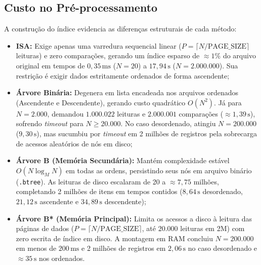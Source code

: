 \documentclass[12pt,a4paper]{article}
\begin{document}
\subsection{Custo no Pré-processamento}
A construção do índice evidencia as diferenças estruturais de cada método:
\begin{itemize}
    \item \textbf{ISA:} Exige apenas uma varredura sequencial linear ($P = \lceil N / \text{PAGE\_SIZE} \rceil$ leituras) e zero comparações, gerando um índice esparso de $\approx 1\%$ do arquivo original em tempos de $0{,}35\,\text{ms}$ ($N=20$) a $17{,}94\,\text{s}$ ($N=2.000.000$). Sua restrição é exigir dados estritamente ordenados de forma ascendente;
    \item \textbf{Árvore Binária:} Degenera em lista encadeada nos arquivos ordenados (Ascendente e Descendente), gerando custo quadrático $O(N^2)$. Já para $N = 2.000$, demandou $1.000.022$ leituras e $2.000.001$ comparações ($\approx 1{,}39\,\text{s}$), sofrendo \textit{timeout} para $N \ge 20.000$. No caso desordenado, atingiu $N = 200.000$ ($9{,}30\,\text{s}$), mas sucumbiu por \textit{timeout} em 2 milhões de registros pela sobrecarga de acessos aleatórios de nós em disco;
    \item \textbf{Árvore B (Memória Secundária):} Mantém complexidade estável $O(N \log_M N)$ em todas as ordens, persistindo seus nós em arquivo binário (\texttt{.btree}). As leituras de disco escalaram de 20 a $\approx 7{,}75$ milhões, completando 2 milhões de itens em tempos contidos ($8{,}64\,\text{s}$ desordenado, $21{,}12\,\text{s}$ ascendente e $34{,}89\,\text{s}$ descendente);
    \item \textbf{Árvore B* (Memória Principal):} Limita os acessos a disco à leitura das páginas de dados ($P = \lceil N / \text{PAGE\_SIZE} \rceil$, até $20.000$ leituras em 2M) com zero escrita de índice em disco. A montagem em RAM concluiu $N=200.000$ em menos de $200\,\text{ms}$ e 2 milhões de registros em $2{,}06\,\text{s}$ no caso desordenado e $\approx 35\,\text{s}$ nos ordenados.
\end{itemize}
\end{document}
